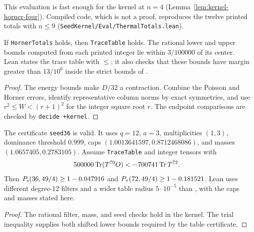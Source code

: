 This evaluation is fast enough for the kernel at \(n = 4\)
(Lemma~\ref{lem:kernel-horner-four}). Compiled code, which is not a proof, reproduces the
twelve printed totals with \(n \le 9\) (\texttt{SeedKernel/Eval/ThermalTotals.lean}).

\begin{theorem}
  \label{thm:spin1-table36}
  \leanok
  If \texttt{HornerTotals} holds, then \texttt{TraceTable} holds.
  The rational lower and upper bounds computed from each printed integer lie within
  \(3/100000\) of its center.
  Lean states the trace table with \(\le\); it also checks that these bounds have
  margin greater than \(13/10^6\) inside the strict bounds of
  \cite[Appendix B.4]{OpenAIHaldane}.
\end{theorem}
\begin{proof}
  \leanok
  The energy bounds make \(D/32\) a contraction.
  Combine the Poisson and Horner errors, identify representative column norms by exact
  symmetries, and use \(r^2 \le W < (r+1)^2\) for the integer square root \(r\).
  The endpoint comparisons are checked by \texttt{decide +kernel}.
\end{proof}

\begin{lemma}
  \label{lem:spin1-certificate36}
  \leanok
  The certificate \texttt{seed36} is valid.
  It uses \(q=12\), \(a=3\), multiplicities \((1,3)\), dominance threshold \(0.999\),
  caps \((1.0013641597,0.8712468086)\), and masses \((1.0657405,0.2783105)\).
  Assume \texttt{TraceTable} and integer tensors with
  \[
    500000\operatorname{Tr}(T^{70}O)<-700741\operatorname{Tr} T^{72}.
  \]
  Then \(P_{\mathrm{s}}(36,49/4)\ge1-0.047916\) and \(P_{\tau}(72,49/4)\ge1-0.181521\).
  Lean uses different degree-12 filters and a wider table radius \(5\cdot10^{-5}\) than
  \cite[Section 5.3]{OpenAIHaldane}, with the caps and masses stated here.
\end{lemma}
\begin{proof}
  \leanok
  The rational filter, mass, and seed checks hold in the kernel.
  The trial inequality supplies both shifted lower bounds required by the table certificate.
\end{proof}

